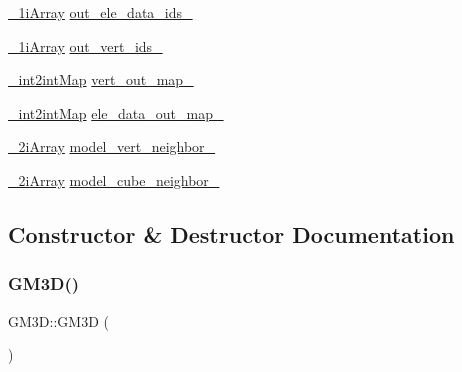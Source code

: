 \begin{DoxyCompactItemize}
\item 
\mbox{\hyperlink{head__func_8h_a9e4349f40fb03f26073ea0d8c99d4704}{\+\_\+1i\+Array}} \mbox{\hyperlink{class_g_m3_d_ac8c5dbe90bfea7d53ae860a30c6a4e45}{out\+\_\+ele\+\_\+data\+\_\+ids\+\_\+}}
\item 
\mbox{\hyperlink{head__func_8h_a9e4349f40fb03f26073ea0d8c99d4704}{\+\_\+1i\+Array}} \mbox{\hyperlink{class_g_m3_d_ae4a26a54e08416379408abd8af63b118}{out\+\_\+vert\+\_\+ids\+\_\+}}
\item 
\mbox{\hyperlink{head__func_8h_a023ca56e61d02d69a823b5e7d9845d17}{\+\_\+int2int\+Map}} \mbox{\hyperlink{class_g_m3_d_acf06f3ee177d896c53ded5ae927a9473}{vert\+\_\+out\+\_\+map\+\_\+}}
\item 
\mbox{\hyperlink{head__func_8h_a023ca56e61d02d69a823b5e7d9845d17}{\+\_\+int2int\+Map}} \mbox{\hyperlink{class_g_m3_d_aadd3dfa00941dd73d81e266978944ff6}{ele\+\_\+data\+\_\+out\+\_\+map\+\_\+}}
\item 
\mbox{\hyperlink{head__func_8h_ae1068d54a7271903a9efdcfac392891c}{\+\_\+2i\+Array}} \mbox{\hyperlink{class_g_m3_d_ab30012ea0e72cdc9e7d5e1a7e137c8eb}{model\+\_\+vert\+\_\+neighbor\+\_\+}}
\item 
\mbox{\hyperlink{head__func_8h_ae1068d54a7271903a9efdcfac392891c}{\+\_\+2i\+Array}} \mbox{\hyperlink{class_g_m3_d_a4ba9a8b512cc82c73d9d18b65da8356b}{model\+\_\+cube\+\_\+neighbor\+\_\+}}
\end{DoxyCompactItemize}


\subsection{Constructor \& Destructor Documentation}
\mbox{\label{class_g_m3_d_ae6a32dc834fb39387e33f359b007b388}} 
\subsubsection{\texorpdfstring{GM3D()}{GM3D()}}
{\footnotesize\ttfamily G\+M3\+D\+::\+G\+M3D (\begin{DoxyParamCaption}{ }\end{DoxyParamCaption})\hspace{0.3cm}{\ttfamily [inline]}}

\mbox{\label{class_g_m3_d_ae0054e01b89d111d23d4ca0d8039c19c}} 
